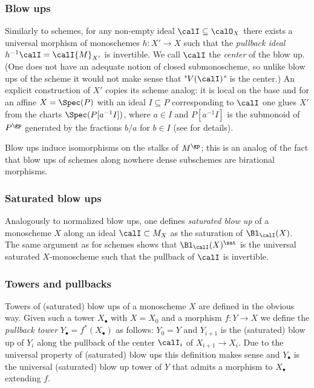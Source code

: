 \documentclass[10pt]{../fichiers-configuration-latex/smfart}
\begin{document}
\subsubsection{Blow ups}\label{8-blowmonosec} Similarly to schemes,
for any non-empty ideal $\calI\subseteq\calO_X$ there exists a
universal morphism of monoschemes $h{\colon}X'\to X$ such that the
{\em pullback ideal} $h^{-1}\calI=\calI{M}_{X'}$ is invertible. We
call $\calI$ the {\em center} of the blow up. (One does not have
an adequate notion of closed submonoscheme, so unlike blow ups
of the scheme it would not make sense that "$V(\calI)$" is the
center.) An explicit construction of $X'$ copies its scheme analog:
it is local on the base and for an affine $X=\Spec(P)$ with an ideal
$I\subseteq P$ corresponding to $\calI$ one glues $X'$ from the
charts $\Spec(P[a^{-1}I])$, where $a\in I$ and $P[a^{-1}I]$ is the
submonoid of $P^\gp$ generated by the fractions $b/a$ for $b\in I$
(see \cite[Ch. 2, \S1.6]{Ogus@book} for details).

\begin{remark2}\label{8-blowmonorem} Blow ups induce isomorphisms on
the stalks of $M^\gp$; this is an analog of the fact that blow ups
of schemes along nowhere dense subschemes are birational morphisms.
\end{remark2}

\subsubsection{Saturated blow ups}\label{8-satblowsec} Analogously
to normalized blow ups, one defines {\em saturated blow up} of a
monoscheme $X$ along an ideal $\calI\subset M_X$ as the saturation
of $\Bl_\calI(X)$. The same argument as for schemes shows that
$\Bl_\calI(X)^\sat$ is the universal saturated $X$-monoscheme such
that the pullback of $\calI$ is invertible.

\subsubsection{Towers and pullbacks}\label{8-towpullsec} Towers
of (saturated) blow ups of a monoscheme $X$ are defined in the
obvious way. Given such a tower $X_\bullet$ with $X=X_0$ and a
morphism $f{\colon}Y\to X$ we define the {\em pullback tower}
$Y_\bullet=f^*(X_\bullet)$ as follows: $Y_0=Y$ and $Y_{i+1}$ is the
(saturated) blow up of $Y_i$ along the pullback of the center
$\calI_i$ of $X_{i+1}\to X_i$. Due to the universal property of
(saturated) blow ups this definition makes sense and $Y_\bullet$
is the universal (saturated) blow up tower of $Y$ that admits a
morphism to $X_\bullet$ extending $f$.
\end{document}
